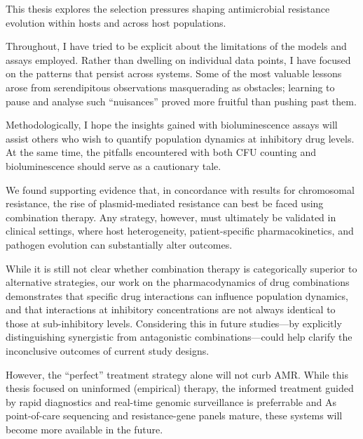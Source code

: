 \documentclass[../main.tex]{subfiles}
\begin{document}
This thesis explores the selection pressures shaping antimicrobial resistance evolution within hosts and across host populations.

Throughout, I have tried to be explicit about the limitations of the models and assays employed. Rather than dwelling on individual data points, I have focused on the patterns that persist across systems. Some of the most valuable lessons arose from serendipitous observations masquerading as obstacles; learning to pause and analyse such “nuisances” proved more fruitful than pushing past them.

Methodologically, I hope the insights gained with bioluminescence assays will assist others who wish to quantify population dynamics at inhibitory drug levels. At the same time, the pitfalls encountered with both CFU counting and bioluminescence should serve as a cautionary tale.

We found supporting evidence that, in concordance with results for chromosomal resistance, the rise of plasmid-mediated resistance can best be faced using combination therapy. Any strategy, however, must ultimately be validated in clinical settings, where host heterogeneity, patient-specific pharmacokinetics, and pathogen evolution can substantially alter outcomes.

While it is still not clear whether combination therapy is categorically superior to alternative strategies, our work on the pharmacodynamics of drug combinations demonstrates that specific drug interactions can influence population dynamics, and that interactions at inhibitory concentrations are not always identical to those at sub-inhibitory levels. Considering this in future studies—by explicitly distinguishing synergistic from antagonistic combinations—could help clarify the inconclusive outcomes of current study designs.

However, the “perfect” treatment strategy alone will not curb AMR.
While this thesis focused on uninformed (empirical) therapy, the informed treatment guided by rapid diagnostics and real-time genomic surveillance is preferrable and
As point-of-care sequencing and resistance-gene panels mature, these systems will become more available in the future.
\end{document}
